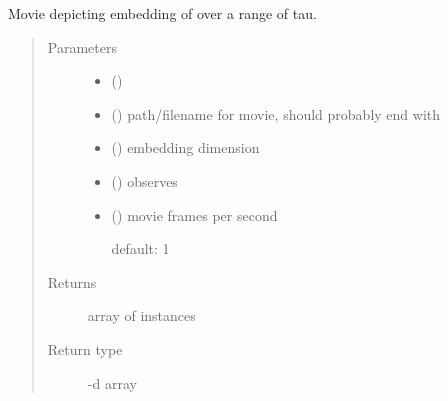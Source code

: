 \documentclass[letterpaper,10pt,openany,oneside,english]{sphinxmanual}
\begin{document}

\begin{fulllineitems}
\label{\detokenize{embed:embed.movies.vary_tau}}
Movie depicting embedding of  over a range of tau.
\begin{quote}\begin{description}
\item[{Parameters}] \leavevmode\begin{itemize}
\item {} 
 ({\hyperref[\detokenize{signals:signals.TimeSeries}]{}}) \textendash{} 

\item {} 
 () \textendash{} path/filename for movie, should probably end with 

\item {} 
 () \textendash{} embedding dimension

\item {} 
 () \textendash{} observes 

\item {} 
 (\sphinxstyleliteralemphasis{, }) \textendash{} 
movie frames per second

default: 1


\end{itemize}

\item[{Returns}] \leavevmode
array of  instances

\item[{Return type}] -d array

\end{description}\end{quote}

\end{fulllineitems}
\end{document}
